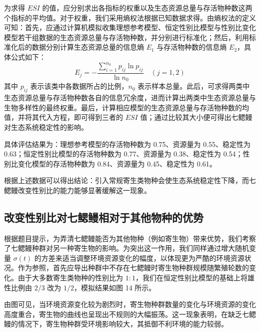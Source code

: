 \documentclass[11pt,a4paper]{ctexart}
\begin{document}
为求得 $ESI$ 的值，应分别求出各指标的权重以及生态资源总量与存活物种数这两个指标的平均值。对于权重，我们采用熵权法根据已知数据求得。由熵权法的定义可知：首先，应通过计算机模拟收集理想参考模型、恒定性别比模型与性别比变化模型若干组数据的生态资源总量与存活物种数，并分别进行标准化；然后，利用标准化后的数据分别计算生态资源总量的信息熵 $E_{1}$ 与存活物种数的信息熵 $E_{2}$，具体公式如下：
\begin{equation}
E_{j}=-\frac{\sum\limits_{i=1}^{n_{0}}p_{ij}\ln p_{ij}}{\ln n_{0}}\quad (j=1,2)
\end{equation}
其中 $p_{ij}$ 表示该类中各数据所占的比例，$n_{0}$ 表示样本总量。此后，可求得两类中生态资源总量与存活物种数各自的信息冗余度，进而计算出两类中生态资源总量与生物多样性的最终权重。最后，计算相应模型的生态资源总量与存活物种数的均值，并将其代入方程，即可得到三者的 $ESI$ 值；通过比较其大小便可得出七鳃鳗对生态系统稳定性的影响。

具体评估结果为：理想参考模型的存活物种数为 0.75、资源量为 0.55、稳定性为 0.63；恒定性别比模型的存活物种数为 0.77、资源量为 0.38、稳定性为 0.54；性别比变化模型的存活物种数为 0.84、资源量为 0.45、稳定性为 0.61。

根据上述数据可以得出结论：引入常规寄生类物种会使生态系统稳定性下降，而七鳃鳗改变性别比的能力能够显著缓解这一现象。

\subsection{改变性别比对七鳃鳗相对于其他物种的优势}

根据题目提示，为弄清七鳃鳗能否为其他物种（例如寄生物）带来优势，我们考察了七鳃鳗种群对另一种寄生物的影响。为突出这一作用，我们同样通过增大随机变量 $\sigma(t)$ 的方差来适当调整环境资源变化的幅度，以体现更为严酷的环境资源状况。作为参照，首先应导出种群中不存在七鳃鳗时寄生物种群规模随繁殖轮数的变化。由于大多数寄生类物种的性别比为 $1:1$，我们在恒定性别比模型的基础上将雄性比例由 $2/3$ 改为 $1/2$，模拟结果如图 14 所示。

由图可见，当环境资源变化较为剧烈时，寄生物种群数量的变化与环境资源的变化高度重合，寄生物的曲线也呈现出不规则的大幅振荡。这一现象表明，在缺乏七鳃鳗的情况下，寄生物种群受环境影响较大，其抵御不利环境的能力较弱。
\end{document}
